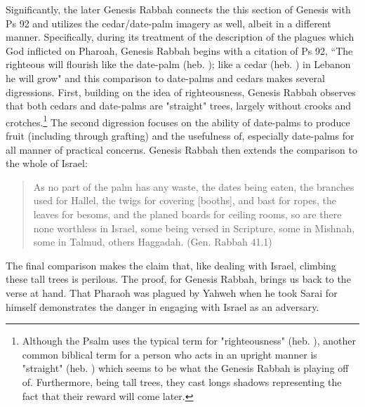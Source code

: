 Significantly, the later Genesis Rabbah connects the this section of Genesis with Ps 92 and utilizes the cedar/date-palm imagery as well, albeit in a different manner. Specifically, during its treatment of the description of the plagues which God inflicted on Pharoah, Genesis Rabbah begins with a citation of Ps 92, ``The righteous will flourish like the date-palm (heb. ); like a cedar (heb. ) in Lebanon he will grow" and this comparison to date-palms and cedars makes several digressions. First, building on the idea of righteousness, Genesis Rabbah observes that both cedars and date-palms are "straight" trees, largely without crooks and crotches.\footnote{Although the Psalm uses the typical term for "righteousness" (heb. ), another common biblical term for a person who acts in an upright manner is "straight" (heb. ) which seems to be what the Genesis Rabbah is playing off of. Furthermore, being tall trees, they cast longs shadows representing the fact that their reward will come later.} The second digression focuses on the ability of date-palms to produce fruit (including through grafting) and the usefulness of, especially date-palms for all manner of practical concerns. Genesis Rabbah then extends the comparison to the whole of Israel:

\begin{quote}
As no part of the palm has any waste, the dates being eaten, the branches used for Hallel, the twigs for covering [booths], and bast for ropes, the leaves for besoms, and the planed boards for ceiling rooms, so are there none worthless in Israel, some being versed in Scripture, some in Mishnah, some in Talmud, others Haggadah. (Gen. Rabbah 41.1)
\end{quote}

The final comparison makes the claim that, like dealing with Israel, climbing these tall trees is perilous. The proof, for Genesis Rabbah, brings us back to the verse at hand. That Pharaoh was plagued by Yahweh when he took Sarai for himself demonstrates the danger in engaging with Israel as an adversary.


